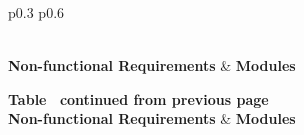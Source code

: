 \documentclass[12pt, titlepage]{article}
\begin{document}
\begin{longtable}{p{} p{}}
  \caption{Trace Between Non-functional Requirements and Modules} \label{TblNFRM} \\
  \toprule
  \textbf{Non-functional Requirements} & \textbf{Modules} \\
  \midrule
  \endfirsthead
  
  {{\bfseries Table \thetable\ continued from previous page}} \\
  \toprule
  \textbf{Non-functional Requirements} & \textbf{Modules} \\
  \midrule
  \endhead
  
  \bottomrule
   \\ 
  \endfoot
  
  \bottomrule
  \endlastfoot
  

\end{longtable}
\end{document}
